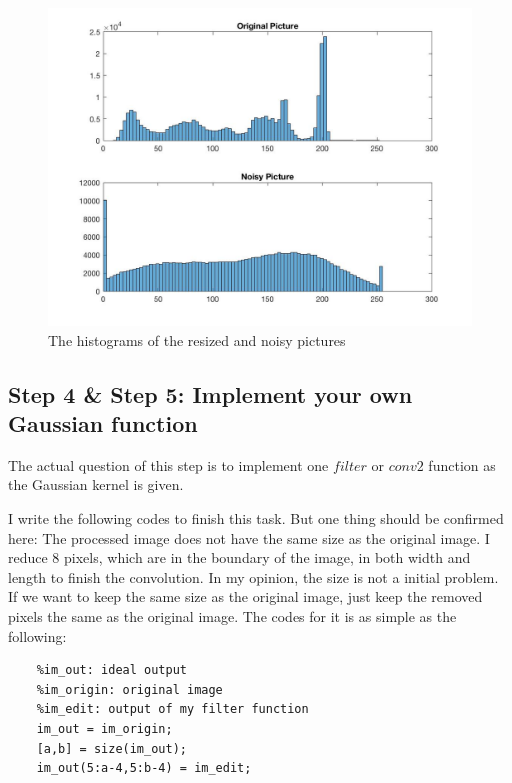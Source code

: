 \documentclass{article}
\begin{document}
\begin{figure}[htbp]
    \centering
    \includegraphics[scale = 0.3]{fig10.jpg}
    \caption{The histograms of the resized and noisy pictures}
    \label{fig10}
\end{figure}

\subsection*{Step 4 \& Step 5: Implement your own Gaussian function}

The actual question of this step is to implement one $filter$ or $conv2$ function as the Gaussian kernel is given. 

I write the following codes to finish this task. But one thing should be confirmed here: The processed image does not have the same size as the original image. I reduce 8 pixels, which are in the boundary of the image, in both width and length to finish the convolution. In my opinion, the size is not a initial problem. If we want to keep the same size as the original image, just keep the removed pixels the same as the original image. The codes for it is as simple as the following:

\begin{lstlisting}
    %im_out: ideal output
    %im_origin: original image
    %im_edit: output of my filter function
    im_out = im_origin;
    [a,b] = size(im_out);
    im_out(5:a-4,5:b-4) = im_edit;
\end{lstlisting}
\end{document}
